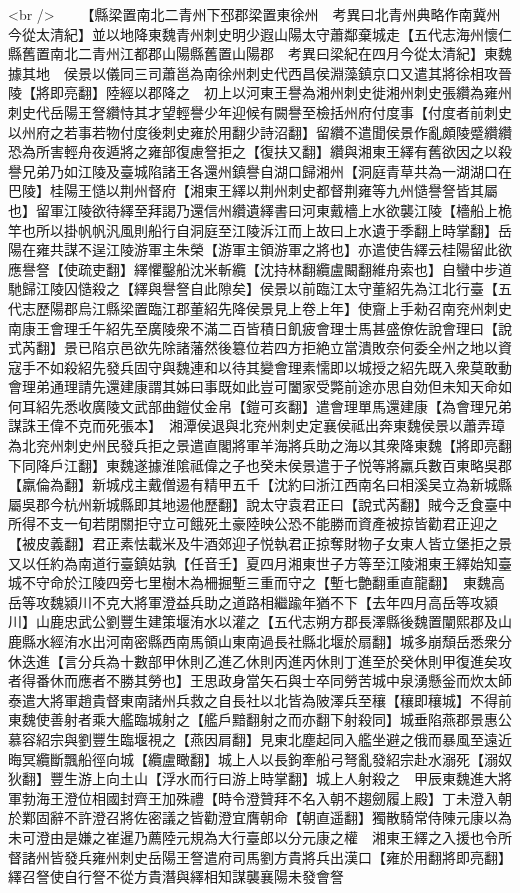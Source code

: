 <br />
　　【縣梁置南北二青州下邳郡梁置東徐州　考異曰北青州典略作南冀州今從太清紀】並以地降東魏青州刺史明少遐山陽太守蕭鄰棄城走【五代志海州懷仁縣舊置南北二青州江都郡山陽縣舊置山陽郡　考異曰梁紀在四月今從太清紀】東魏據其地　侯景以儀同三司蕭邕為南徐州刺史代西昌侯淵藻鎮京口又遣其將徐相攻晉陵【將即亮翻】陸經以郡降之　初上以河東王譽為湘州刺史徙湘州刺史張纘為雍州刺史代岳陽王詧纘恃其才望輕譽少年迎候有闕譽至檢括州府付度事【付度者前刺史以州府之若事若物付度後刺史雍於用翻少詩沼翻】留纘不遣聞侯景作亂頗陵蹙纘纘恐為所害輕舟夜遁將之雍部復慮詧拒之【復扶又翻】纘與湘東王繹有舊欲因之以殺譽兄弟乃如江陵及臺城陷諸王各還州鎮譽自湖口歸湘州【洞庭青草共為一湖湖口在巴陵】桂陽王慥以荆州督府【湘東王繹以荆州刺史都督荆雍等九州慥譽詧皆其屬也】留軍江陵欲待繹至拜謁乃還信州纘遺繹書曰河東戴檣上水欲襲江陵【檣船上桅竿也所以掛帆帆汎風則船行自洞庭至江陵泝江而上故曰上水遺于季翻上時掌翻】岳陽在雍共謀不逞江陵游軍主朱榮【游軍主領游軍之將也】亦遣使告繹云桂陽留此欲應譽詧【使疏吏翻】繹懼鑿船沈米斬纜【沈持林翻纜盧闞翻維舟索也】自蠻中步道馳歸江陵囚慥殺之【繹與譽詧自此隙矣】侯景以前臨江太守董紹先為江北行臺【五代志歷陽郡烏江縣梁置臨江郡董紹先降侯景見上卷上年】使齎上手勑召南兖州刺史南康王會理壬午紹先至廣陵衆不滿二百皆積日飢疲會理士馬甚盛僚佐說會理曰【說式芮翻】景已陷京邑欲先除諸藩然後簒位若四方拒絶立當潰敗奈何委全州之地以資寇手不如殺紹先發兵固守與魏連和以待其變會理素懦即以城授之紹先既入衆莫敢動會理弟通理請先還建康謂其姊曰事既如此豈可闔家受斃前途亦思自効但未知天命如何耳紹先悉收廣陵文武部曲鎧仗金帛【鎧可亥翻】遣會理單馬還建康【為會理兄弟謀誅王偉不克而死張本】　湘潭侯退與北兖州刺史定襄侯祗出奔東魏侯景以蕭弄璋為北兖州刺史州民發兵拒之景遣直閣將軍羊海將兵助之海以其衆降東魏【將即亮翻下同降戶江翻】東魏遂據淮隂祗偉之子也癸未侯景遣于子悦等將羸兵數百東略吳郡【羸倫為翻】新城戍主戴僧逷有精甲五千【沈約曰浙江西南名曰相溪吴立為新城縣屬吳郡今杭州新城縣即其地逷他歷翻】說太守袁君正曰【說式芮翻】賊今乏食臺中所得不支一旬若閉關拒守立可餓死土豪陸映公恐不能勝而資產被掠皆勸君正迎之【被皮義翻】君正素怯載米及牛酒郊迎子悦執君正掠奪財物子女東人皆立堡拒之景又以任約為南道行臺鎮姑孰【任音壬】夏四月湘東世子方等至江陵湘東王繹始知臺城不守命於江陵四旁七里樹木為柵掘塹三重而守之【塹七艶翻重直龍翻】　東魏高岳等攻魏潁川不克大將軍澄益兵助之道路相繼踰年猶不下【去年四月高岳等攻潁川】山鹿忠武公劉豐生建策堰洧水以灌之【五代志朔方郡長澤縣後魏置闡熙郡及山鹿縣水經洧水出河南密縣西南馬領山東南過長社縣北堰於扇翻】城多崩頹岳悉衆分休迭進【言分兵為十數部甲休則乙進乙休則丙進丙休則丁進至於癸休則甲復進矣攻者得番休而應者不勝其勞也】王思政身當矢石與士卒同勞苦城中泉湧懸釡而炊太師泰遣大將軍趙貴督東南諸州兵救之自長社以北皆為陂澤兵至穰【穰即穰城】不得前東魏使善射者乘大艦臨城射之【艦戶黯翻射之而亦翻下射殺同】城垂陷燕郡景惠公慕容紹宗與劉豐生臨堰視之【燕因肩翻】見東北塵起同入艦坐避之俄而暴風至遠近晦冥纜斷飄船徑向城【纜盧瞰翻】城上人以長鉤牽船弓弩亂發紹宗赴水溺死【溺奴狄翻】豐生游上向土山【浮水而行曰游上時掌翻】城上人射殺之　甲辰東魏進大將軍勃海王澄位相國封齊王加殊禮【時令澄贊拜不名入朝不趨劒履上殿】丁未澄入朝於鄴固辭不許澄召將佐密議之皆勸澄宜膺朝命【朝直遥翻】獨散騎常侍陳元康以為未可澄由是嫌之崔暹乃薦陸元規為大行臺郎以分元康之權　湘東王繹之入援也令所督諸州皆發兵雍州刺史岳陽王詧遣府司馬劉方貴將兵出漢口【雍於用翻將即亮翻】繹召詧使自行詧不從方貴潛與繹相知謀襲襄陽未發會詧